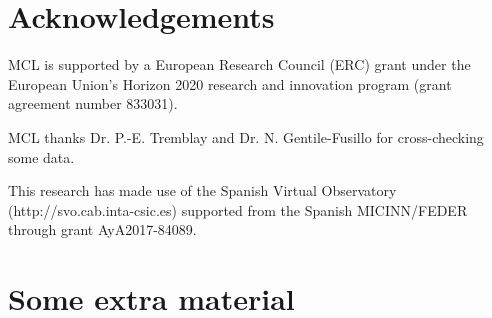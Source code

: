 \documentclass[fleqn,usenatbib]{rasti}
\begin{document}
\section*{Acknowledgements}
MCL is supported by a European Research Council (ERC) grant under the European
Union’s Horizon 2020 research and innovation program (grant agreement number
833031).

MCL thanks Dr. P.-E. Tremblay and Dr. N. Gentile-Fusillo for cross-checking
some data.

This research has made use of the Spanish Virtual Observatory
(http://svo.cab.inta-csic.es) supported from the Spanish MICINN/FEDER through
grant AyA2017-84089.











\appendix

\section{Some extra material}



\bsp	%
\label{lastpage}
\end{document}
